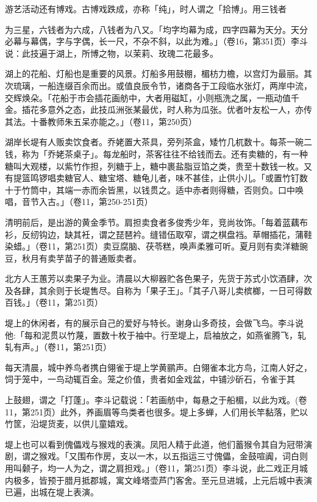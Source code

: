 游艺活动还有博戏。古博戏跌成，亦称「纯」，时人谓之「拾博」。用三钱者


\noindent 为三星，六钱者为六成，八钱者为八又。「均字均幕为成，四字四幕为天分。天分必幕与幕偶，字与字偶，长一尺，不杂不斜，以此为难。」（卷16，第351页）李斗说：此技遍于湖上，所博之物，以茉莉、玫瑰二花最多。

湖上的花船、灯船也是重要的风景。灯船多用鼓棚，楣枋力檐，以宫灯为最丽。其次琉璃，一船连缀百余而出。或值良辰令节，诸商各于工段临水张灯，两岸中流，交辉焕朵。「花船于市会插花画舫中，大者用磁缸，小则瓶洗之属，一瓶动值千金。插花多意外之态，此技瓜洲张某最优，时人称为瓜张。优者叶友松一人，亦传其法。十番教师朱五呆亦能之。」（卷11，第250页）

湖岸长堤有人贩卖饮食者。乔姥置大茶具，旁列茶盒，矮竹几杌数十。每茶一碗二钱，称为「乔姥茶桌子」。每龙船时，茶客往往不给钱而去。还有卖糖的，有一种糖叫大观楼，以紫竹作担，列糖于上，糖中裹盐脂豆馅之类，贵至十数钱一枚。又有提篮鸣锣唱卖糖官人、糖宝塔、糖龟儿者，味不甚佳，止供小儿。「或置竹钉数十于竹筒中，其端一赤而余皆黑，以钱贯之。适中赤者则得糖，否则负。口中唤唱，音节入古。」（卷11，第250-251页）

清明前后，是出游的黄金季节。肩担卖食者多俊秀少年，竞尚妆饰。「每着蓝藕布衫，反纫钩边，缺其衽，谓之琵琶衿。缝错伍取窄，谓之棋盘裆。草帽插花，蒲鞋染蜡。」（卷11，第251页）卖豆腐脑、茯苓糕，唤声柔雅可听。夏月则有卖洋糖豌豆，秋月有卖芋苗子的普通贩卖者。

北方人王蕙芳以卖果子为业。清晨以大柳器贮各色果子，先货于苏式小饮酒肆，次及各肆，其余则于长堤售尽。自称为「果子王」。「其子八哥儿卖槟榔，一日可得数百钱。」（卷11，第251页）

堤上的休闲者，有的展示自己的爱好与特长。谢身山多奇技，会做飞鸟。李斗说他:「每和泥贯以竹蔑，置数十枚于袖中。行至堤上，启袖放之，如燕雀腾飞，轧轧有声。」（卷11，第251页）

每天清晨，城中养鸟者携白翎雀于堤上学黄鹂声。白翎雀本北方鸟，江南人好之，饲于笼中，一鸟动辄百金。笼之价值，贵者如金戏盆，中铺沙斫石，令雀于其


\noindent 上鼓翅，谓之「打蓬」。李斗记载说：「若画舫中，每悬之于船楣，以此为戏。(卷11，第251页）此外，养画眉等鸟类者也很多。堤上多蝉，人们用长竿黏落，贮以竹筐，沿堤货麦，以供儿童嬉戏。

堤上也可以看到傀儡戏与猴戏的表演。凤阳人精于此道，他们蓄猴令其自为冠带演剧，谓之猴戏。「又围布作房，支以一木，以五指运三寸傀儡，金鼓喧阗，词白则用叫颡子，均一人为之，谓之肩担戏。」（卷11，第251页）李斗说，此二戏正月城内极多，皆预于腊月抵郡城，寓文峰塔壶芦门客舍。至元旦进城，上元后城中表演已遍，出城在堤上表演。


